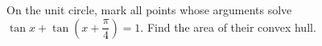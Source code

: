 On the unit circle, mark all points whose arguments solve $\tan x+\tan(x+\dfrac{\pi}{4})=1$. Find the area of their convex hull.

